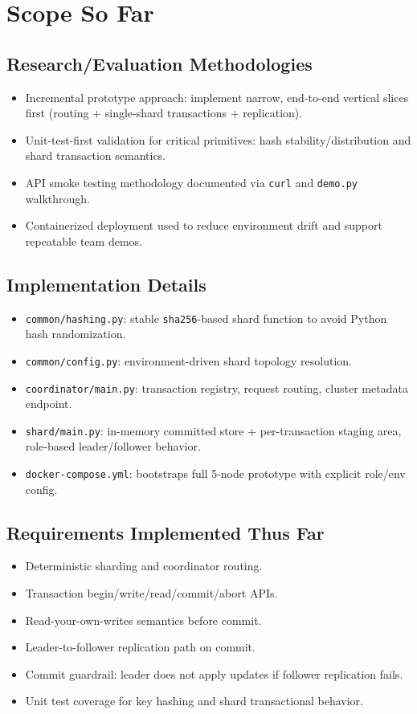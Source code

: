 \documentclass[11pt]{article}
\begin{document}
\section{Scope So Far}
\subsection*{Research/Evaluation Methodologies}
\begin{itemize}[leftmargin=1.2em]
    \item Incremental prototype approach: implement narrow, end-to-end vertical slices first (routing + single-shard transactions + replication).
    \item Unit-test-first validation for critical primitives: hash stability/distribution and shard transaction semantics.
    \item API smoke testing methodology documented via \texttt{curl} and \texttt{demo.py} walkthrough.
    \item Containerized deployment used to reduce environment drift and support repeatable team demos.
\end{itemize}

\subsection*{Implementation Details}
\begin{itemize}[leftmargin=1.2em]
    \item \texttt{common/hashing.py}: stable \texttt{sha256}-based shard function to avoid Python hash randomization.
    \item \texttt{common/config.py}: environment-driven shard topology resolution.
    \item \texttt{coordinator/main.py}: transaction registry, request routing, cluster metadata endpoint.
    \item \texttt{shard/main.py}: in-memory committed store + per-transaction staging area, role-based leader/follower behavior.
    \item \texttt{docker-compose.yml}: bootstraps full 5-node prototype with explicit role/env config.
\end{itemize}

\subsection*{Requirements Implemented Thus Far}
\begin{itemize}[leftmargin=1.2em]
    \item Deterministic sharding and coordinator routing.
    \item Transaction begin/write/read/commit/abort APIs.
    \item Read-your-own-writes semantics before commit.
    \item Leader-to-follower replication path on commit.
    \item Commit guardrail: leader does not apply updates if follower replication fails.
    \item Unit test coverage for key hashing and shard transactional behavior.
\end{itemize}
\end{document}
